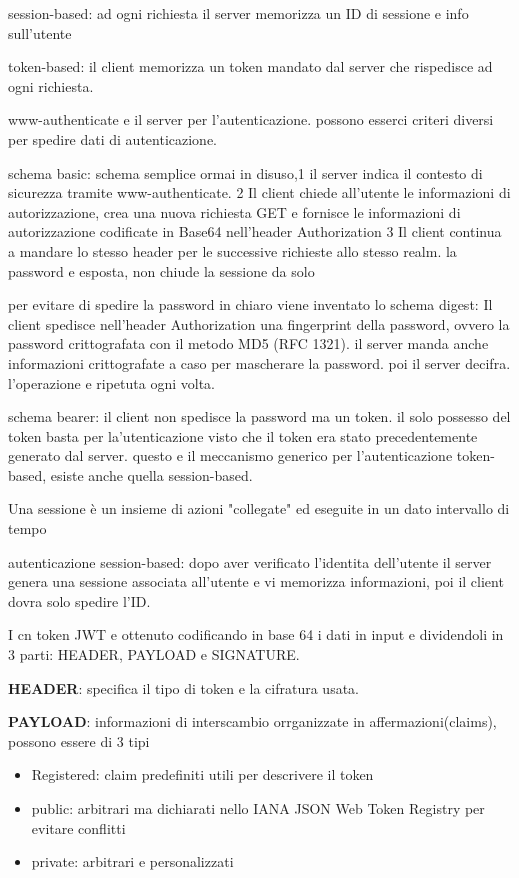 \documentclass[12pt]{article}
\begin{document}
session-based: ad ogni richiesta il server memorizza un ID di sessione e info sull'utente

token-based: il client memorizza un token mandato dal server che rispedisce ad ogni richiesta.

www-authenticate e il server per l'autenticazione. possono esserci criteri diversi per spedire dati di autenticazione.

schema basic: schema semplice ormai in disuso,1 il server indica il contesto di sicurezza tramite www-authenticate.
2 Il client chiede all'utente le informazioni di autorizzazione, crea una
nuova richiesta GET e fornisce le informazioni di autorizzazione
codificate in Base64 nell'header Authorization
3 Il client continua a mandare lo stesso header per le successive
richieste allo stesso realm.
la password e esposta, non chiude la sessione da solo

per evitare di spedire la password in chiaro viene inventato lo schema digest:
Il client spedisce nell'header Authorization una fingerprint della password,
ovvero la password crittografata con il metodo MD5 (RFC 1321). il server manda anche informazioni crittografate a caso per mascherare la password. poi il server decifra. l'operazione e ripetuta ogni volta.

schema bearer: il client non spedisce la password ma un token.
il solo possesso del token basta per la'utenticazione visto che il token era stato precedentemente generato dal server.
questo e il meccanismo generico per l'autenticazione token-based, esiste anche quella session-based.

Una sessione è un insieme di azioni "collegate" ed eseguite
in un dato intervallo di tempo

autenticazione session-based: dopo aver verificato l'identita dell'utente il server genera una sessione associata all'utente e vi memorizza informazioni, poi il client dovra solo spedire l'ID.

I cn token JWT e ottenuto codificando in base 64 i dati in input e dividendoli in 3 parti: HEADER, PAYLOAD e SIGNATURE.

\textbf{HEADER}: specifica il tipo di token e la cifratura usata.

\textbf{PAYLOAD}: informazioni di interscambio orrganizzate in affermazioni(claims), possono essere di 3 tipi
\begin{itemize}
    \item Registered: claim predefiniti utili per descrivere il token
    \item public: arbitrari ma dichiarati nello IANA JSON Web Token
Registry per evitare conflitti 
\item private: arbitrari e personalizzati
\end{itemize}
\end{document}
